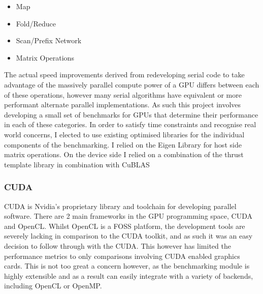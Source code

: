 \begin{itemize} 
    \item Map 
    \item Fold/Reduce 
    \item Scan/Prefix Network 
    \item Matrix Operations
\end{itemize}

The actual speed improvements derived from redeveloping serial code to take advantage of the
massively parallel compute power of a GPU differs between each of these operations, however many
serial algorithms have equivalent or more performant alternate parallel implementations. As such
this project involves developing a small set of benchmarks for GPUs that determine their
performance in each of these categories. In order to satisfy time constraints and recognise real
world concerns, I elected to use existing optimised libraries for the individual components of the
benchmarking. I relied on the Eigen Library \cite{eigen} for host side matrix operations. On the
device side I relied on a combination of the thrust template library \cite{thrust} in combination
with CuBLAS \cite{cublas}

\subsubsection{CUDA} 
CUDA is Nvidia's proprietary library and toolchain for developing parallel
software. There are 2 main frameworks in the GPU programming space, CUDA and OpenCL. Whilst OpenCL
is a FOSS platform, the development tools are severely lacking in comparison to the CUDA toolkit, and
as such it was an easy decision to follow through with the CUDA. This however has limited the
performance metrics to only comparisons involving CUDA enabled graphics cards. This is not too great
a concern however, as the benchmarking module is highly extensible and as a result can easily
integrate with a variety of backends, including OpenCL or OpenMP.
